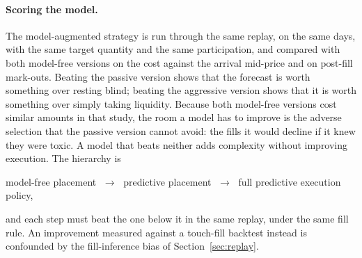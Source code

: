 \paragraph{Scoring the model.} The model-augmented strategy is run through the same replay, on the same days,
with the same target quantity and the same participation, and compared with both model-free versions on the cost
against the arrival mid-price and on post-fill mark-outs. Beating the passive version shows that the forecast is worth
something over resting blind; beating the aggressive version shows that it is worth something over simply taking
liquidity. Because both model-free versions cost similar amounts in that study, the room a model has to improve is the adverse
selection that the passive version cannot avoid: the fills it would decline if it knew they were toxic. A model that
beats neither adds complexity without improving execution. The hierarchy is
\begin{center}
model-free placement $\;\to\;$ predictive placement $\;\to\;$ full predictive execution policy,
\end{center}
and each step must beat the one below it in the same replay, under the same fill rule. An improvement measured against
a touch-fill backtest instead is confounded by the fill-inference bias of Section~\ref{sec:replay}.

